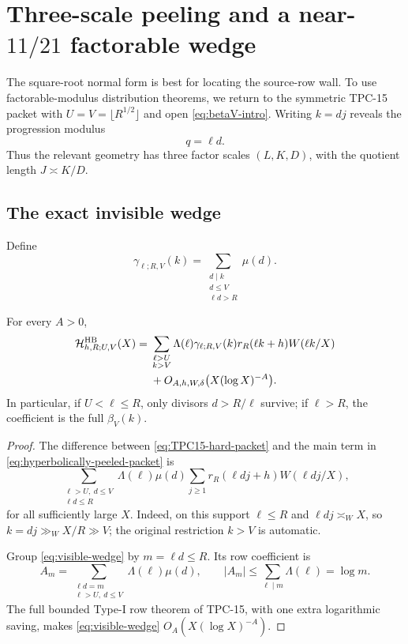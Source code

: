 \section{Three-scale peeling and a near-\texorpdfstring{$11/21$}{11/21}
factorable wedge}
\label{sec:factorable-wedge}

The square-root normal form is best for locating the source-row wall.  To
use factorable-modulus distribution theorems, we return to the symmetric
TPC-15 packet with $U=V=\lfloor R^{1/2}\rfloor$ and open
\eqref{eq:betaV-intro}.  Writing $k=dj$ reveals the progression modulus
\begin{equation}
 q=\ell d.
 \label{eq:true-progression-modulus}
\end{equation}
Thus the relevant geometry has three factor scales $(L,K,D)$, with the
quotient length $J\asymp K/D$.

\subsection{The exact invisible wedge}

Define
\begin{equation}
 \gamma_{\ell;R,V}(k)=
 \sum_{\substack{d\mid k\\d\le V\\\ell d>R}}\mu(d).
 \label{eq:invisible-divisor-coefficient}
\end{equation}

\begin{proposition}
\label{prop:hyperbolic-peeling}
For every $A>0$,
\begin{align}
 \mathcal H^{\rm HB}_{h,R;U,V}(X)
 ={}&\sum_{\substack{\ell>U\\k>V}}
 \Lambda(\ell)\gamma_{\ell;R,V}(k)
 r_R(\ell k+h)W(\ell k/X)
 \notag\\
 &+O_{A,h,W,\delta}\bigl(X(\log X)^{-A}\bigr).
 \label{eq:hyperbolically-peeled-packet}
\end{align}
In particular, if $U<\ell\le R$, only divisors $d>R/\ell$ survive; if
$\ell>R$, the coefficient is the full $\beta_V(k)$.
\end{proposition}

\begin{proof}
The difference between \eqref{eq:TPC15-hard-packet} and the main term in
\eqref{eq:hyperbolically-peeled-packet} is
\begin{equation}
 \sum_{\substack{\ell>U,\ d\le V\\\ell d\le R}}
 \Lambda(\ell)\mu(d)
 \sum_{j\ge1}r_R(\ell dj+h)W(\ell dj/X),
 \label{eq:visible-wedge}
\end{equation}
for all sufficiently large $X$.  Indeed, on this support
$\ell\le R$ and $\ell dj\asymp_WX$, so
$k=dj\gg_WX/R\gg V$; the original restriction $k>V$ is automatic.

Group \eqref{eq:visible-wedge} by $m=\ell d\le R$.  Its row coefficient
is
\[
 A_m=\sum_{\substack{\ell d=m\\\ell>U,\ d\le V}}
 \Lambda(\ell)\mu(d),
 \qquad |A_m|\le\sum_{\ell\mid m}\Lambda(\ell)=\log m.
\]
The full bounded Type-I row theorem of TPC-15, with one extra logarithmic
saving, makes \eqref{eq:visible-wedge}
$O_A(X(\log X)^{-A})$.
\end{proof}

